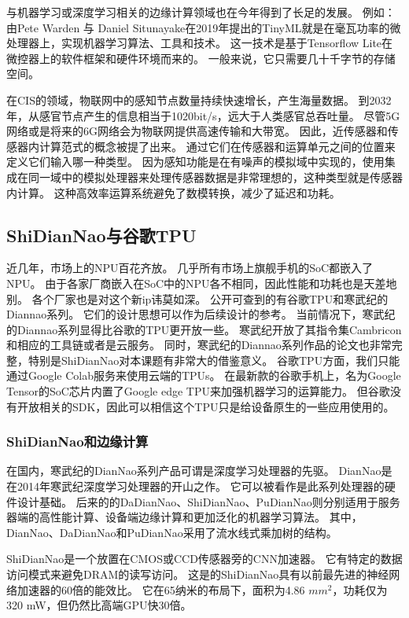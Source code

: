 与机器学习或深度学习相关的边缘计算领域也在今年得到了长足的发展。
例如：由Pete Warden 与 Daniel Situnayake在2019年提出的TinyML就是在毫瓦功率的微处理器上，实现机器学习算法、工具和技术\cite{tinyml2019}。
这一技术是基于Tensorflow Lite在微控器上的软件框架和硬件环境而来的。
一般来说，它只需要几十千字节的存储空间。  

在CIS的领域，物联网中的感知节点数量持续快速增长，产生海量数据。
到2032年，从感官节点产生的信息相当于1020bit/s，远大于人类感官总吞吐量\cite{2020Near}。
尽管5G网络或是将来的6G网络会为物联网提供高速传输和大带宽。
因此，近传感器和传感器内计算范式的概念被提了出来。
通过它们在传感器和运算单元之间的位置来定义它们输入哪一种类型。
因为感知功能是在有噪声的模拟域中实现的，使用集成在同一域中的模拟处理器来处理传感器数据是非常理想的，这种类型就是传感器内计算。
这种高效率运算系统避免了数模转换，减少了延迟和功耗。


\subsection{ShiDianNao与谷歌TPU}
近几年，市场上的NPU百花齐放。
几乎所有市场上旗舰手机的SoC都嵌入了NPU。
由于各家厂商嵌入在SoC中的NPU各不相同，因此性能和功耗也是天差地别。
各个厂家也是对这个新ip讳莫如深。
公开可查到的有谷歌TPU\cite{2017In}和寒武纪的Diannao\cite{2014DianNao}系列。
它们的设计思想可以作为后续设计的参考。
当前情况下，寒武纪的Diannao系列显得比谷歌的TPU更开放一些。
寒武纪开放了其指令集Cambricon\cite{2016Cambricon}和相应的工具链或者是云服务。
同时，寒武纪的Diannao系列作品的论文也非常完整，特别是ShiDianNao\cite{2015ShiDianNao}对本课题有非常大的借鉴意义。
谷歌TPU方面，我们只能通过Google Colab服务来使用云端的TPUs。
在最新款的谷歌手机上，名为Google Tensor的SoC芯片内置了Google edge TPU来加强机器学习的运算能力。
但谷歌没有开放相关的SDK，因此可以相信这个TPU只是给设备原生的一些应用使用的。


\subsubsection{ShiDianNao和边缘计算}
在国内，寒武纪的DianNao系列产品可谓是深度学习处理器的先驱。
DianNao是在2014年寒武纪深度学习处理器的开山之作。
它可以被看作是此系列处理器的硬件设计基础。
后来的的DaDianNao、ShiDianNao、PuDianNao则分别适用于服务器端的高性能计算、设备端边缘计算和更加泛化的机器学习算法。
其中，DianNao、DaDianNao和PuDianNao采用了流水线式乘加树的结构。  %


ShiDianNao是一个放置在CMOS或CCD传感器旁的CNN加速器\cite{2015ShiDianNao}。
它有特定的数据访问模式来避免DRAM的读写访问。
这是的ShiDianNao具有以前最先进的神经网络加速器的60倍的能效比。
它在65纳米的布局下，面积为4.86 $mm^2$，功耗仅为320 mW，但仍然比高端GPU快30倍。


